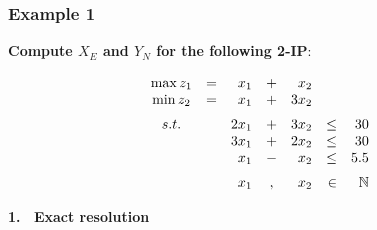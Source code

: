 \documentclass[]{beamer}
\begin{document}
% 
%

\begin{frame}
  \frametitle{Example 1}
\vspace{3mm}

\textbf{Compute $X_E$ and $Y_N$ for the following 2-IP}:
\vspace{2mm}

    \[
\begin{array}{crrcrrrl}
\max z_1 & = & x_1 & + & x_2  \\
\min z_2 & = & x_1 & + & 3x_2 \vspace{2mm}\\
s.t. & & 2x_1 & + &  3x_2 & \le & 30 \\
    &&  3x_1 & + &  2x_2 & \le & 30 \\
    &&   x_1 & - &   x_2 & \le & 5.5 \vspace{2mm}\\
    &&   x_1 & , &   x_2 & \in & \mathbb{N}
\end{array}
\]
\vspace{0mm}

\vfill

\end{frame}


\begin{frame}

\centerline 
{\Large \textbf{1. \ Exact resolution}}

\end{frame}

% 
%
\end{document}
